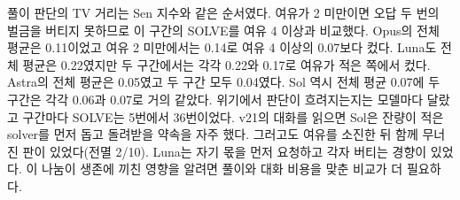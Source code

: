 풀이 판단의 TV 거리는 Sen 지수와 같은 순서였다. 여유가 2 미만이면 오답 두 번의 벌금을 버티지 못하므로 이 구간의 SOLVE를 여유 4 이상과 비교했다. Opus의 전체 평균은 0.11이었고 여유 2 미만에서는 0.14로 여유 4 이상의 0.07보다 컸다. Luna도 전체 평균은 0.22였지만 두 구간에서는 각각 0.22와 0.17로 여유가 적은 쪽에서 컸다. Astra의 전체 평균은 0.05였고 두 구간 모두 0.04였다. Sol 역시 전체 평균 0.07에 두 구간은 각각 0.06과 0.07로 거의 같았다. 위기에서 판단이 흐려지는지는 모델마다 달랐고 구간마다 SOLVE는 5번에서 36번이었다. v21의 대화를 읽으면 Sol은 잔량이 적은 solver를 먼저 돕고 돌려받을 약속을 자주 했다. 그러고도 여유를 소진한 뒤 함께 무너진 판이 있었다(전멸 2/10). Luna는 자기 몫을 먼저 요청하고 각자 버티는 경향이 있었다. 이 나눔이 생존에 끼친 영향을 알려면 풀이와 대화 비용을 맞춘 비교가 더 필요하다.

\begin{table}[t]
\centering
\caption{모델별 공존 아레나 결과를 v20(잔량 공개)의 평균 Sen 지수 순으로 놓았다. v20의 예비 결과이며 현재 v33의 결과는 아니다. 모델마다 10판이며 M은 백만 토큰이다. 판당 남은 자리는 끝까지 남은 자리의 판 평균이고 꺼짐과 EXIT는 40자리 중 수, GIVE는 10판의 총횟수다. $\rho$는 식 (\ref{eq:rho})의 생존 지표이며 대괄호는 판 단위 부트스트랩 95\% 구간이다. TV는 solver 판단의 평균 TV 거리로 낮을수록 좋다.}
\label{tab:arena-rank}

\end{table}
